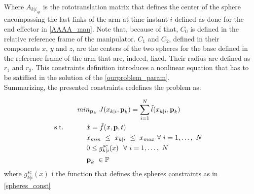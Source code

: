 	Where $A_{{k|i}_{sp}}$ is the rototranslation matrix that defines the center of the sphere encompassing the last links of the arm at time instant $i$ defined as done for the end effector in \ref{AAAA_man}. Note that, because of that, ${C_0}$ is defined in the relative reference frame of the manipulator. ${C_1}$ and ${C_2}$, defined in their components $x$, $y$ and $z$, are the centers of the two spheres for the base defined in the reference frame of the arm that are, indeed, fixed. Their radius are defined as $r_1$ and $r_2$. This constraints definition introduces a nonlinear equation that has to be satiflied in the solution of the \ref{ourproblem_param}. \\

Summarizing, the presented constraints redefines the problem as:

\begin{equation} \label{ourproblem_param}
	\begin{split}
			& min_{\textbf{p}_k}\ J({x}_{k|i},\textbf{p}_k) = \sum_{i=1}^{N}\tilde{l}({x}_{k|i},\textbf{p}_k) \\
			\textnormal{s.t.}\qquad
			&\ \ \ \ \dot{{x}}=\tilde{f}({x},\textbf{p},t) \\
			&\ \ \ \ {x}_{min}\ \leq\ x_{k|i}\ \leq\ {x}_{max}\  \forall\ i=1,\dots,\ N  \\
			&\ \ \ \ 0 \leq g^{sc}_{k|i}(x)\ \ \forall\ i=1,\dots,\ N \\
			&\ \ \ \ \textbf{p}_k\   \in \mathbb{P}\ \\
	\end{split}	
\end{equation}
where $g^{sc}_{k|i}(x)$ i the function that defines the spheres constraints as in \ref{spheres_const}

